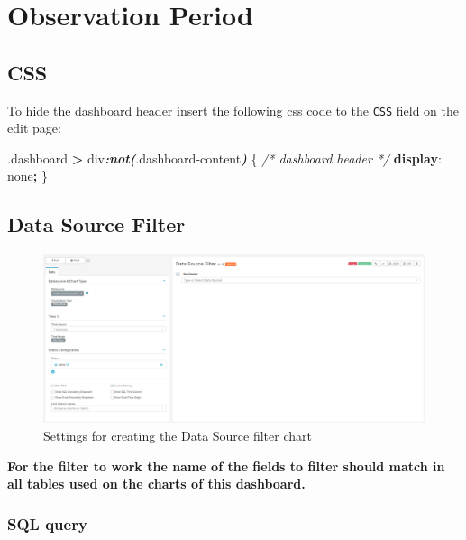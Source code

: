 \documentclass[
]{book}
\newenvironment{Shaded}{\begin{snugshade}}{\end{snugshade}}
\newcommand{\CommentTok}[1]{\textcolor[rgb]{0.56,0.35,0.01}{\textit{#1}}}
\newcommand{\DecValTok}[1]{\textcolor[rgb]{0.00,0.00,0.81}{#1}}
\newcommand{\FunctionTok}[1]{\textcolor[rgb]{0.00,0.00,0.00}{#1}}
\newcommand{\InformationTok}[1]{\textcolor[rgb]{0.56,0.35,0.01}{\textbf{\textit{#1}}}}
\newcommand{\KeywordTok}[1]{\textcolor[rgb]{0.13,0.29,0.53}{\textbf{#1}}}
\newcommand{\NormalTok}[1]{#1}
\newcommand{\OperatorTok}[1]{\textcolor[rgb]{0.81,0.36,0.00}{\textbf{#1}}}
\begin{document}
\hypertarget{observation-period}{%
\chapter{Observation Period}\label{observation-period}}

\hypertarget{css-2}{%
\section{CSS}\label{css-2}}

To hide the dashboard header insert the following css code to the \texttt{CSS} field on the edit page:

\begin{Shaded}
\begin{Highlighting}[]
\FunctionTok{.dashboard} \OperatorTok{\textgreater{}}\NormalTok{ div}\InformationTok{:not(}\FunctionTok{.dashboard{-}content}\InformationTok{)}\NormalTok{ \{  }\CommentTok{/* dashboard header */}
  \KeywordTok{display}\NormalTok{: }\DecValTok{none}\OperatorTok{;}
\NormalTok{\}}
\end{Highlighting}
\end{Shaded}

\hypertarget{data-source-filter-1}{%
\section{Data Source Filter}\label{data-source-filter-1}}

\begin{figure}
\includegraphics[width=1\linewidth]{images/shared/data_source_filter} \caption{Settings for creating the Data Source filter chart}\label{fig:dataSourceFilter}
\end{figure}

\textbf{For the filter to work the name of the fields to filter should match in all tables used on the charts of this dashboard.}

\hypertarget{sql-query-12}{%
\subsection{SQL query}\label{sql-query-12}}
\end{document}
